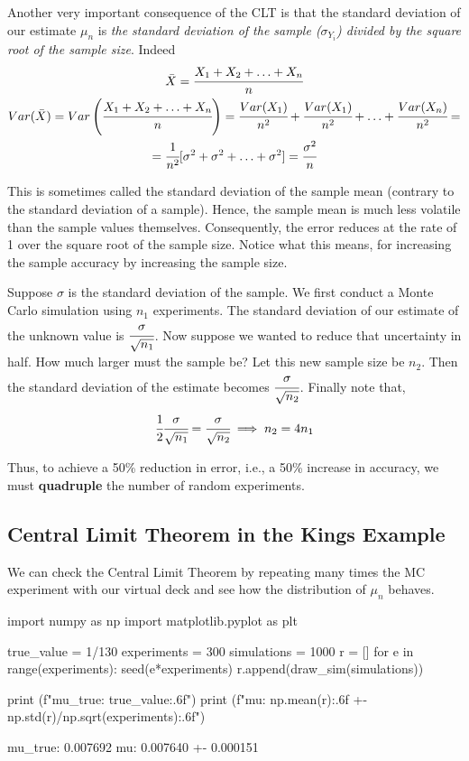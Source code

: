 Another very important consequence of the CLT is that the standard deviation of our estimate $\mu_n$ is \emph{the standard deviation of the sample ($\sigma_{Y_i}$) divided by the square root of the sample size}. Indeed
\begin{equation*}
\begin{gathered}
\bar{X} = \cfrac{X_1 + X_2 +\ldots +X_n}{n}\\
Var(\bar{X}) = Var\left(\cfrac{X_1 + X_2 +\ldots +X_n}{n}\right)=\cfrac{Var(X_1)}{n^2}+\cfrac{Var(X_1)}{n^2}+\ldots+\cfrac{Var(X_n)}{n^2} = \\
=\cfrac{1}{n^2}[\sigma^2+\sigma^2+\ldots+\sigma^2] = \cfrac{\sigma^2}{n}
\end{gathered}
\end{equation*}

This is sometimes called the standard deviation of the sample mean (contrary to the standard deviation of a sample). Hence, the sample mean is much less volatile than the sample values themselves. Consequently, the error reduces at the rate of 1 over the square root of the sample size. Notice what this means, for increasing the sample accuracy by increasing the sample size.

Suppose $\sigma$ is the standard deviation of the sample. We first conduct a Monte Carlo simulation using $n_1$ experiments. The standard deviation of our estimate of the unknown value is $\cfrac{\sigma}{\sqrt{n_1}}$. Now suppose we wanted to reduce that uncertainty in half. How much larger must the sample be? Let this new sample size be $n_2$. Then the standard deviation of the estimate becomes $\cfrac{\sigma}{\sqrt{n_2}}$.
Finally note that,
\begin{equation*}
  \cfrac{1}{2}\cfrac{\sigma}{\sqrt{n_1}}  = \cfrac{\sigma}{\sqrt{n_2}} \implies n_2 = 4 n_1
\end{equation*}

Thus, to achieve a 50\% reduction in error, i.e., a 50\% increase in accuracy, we must \textbf{quadruple} the number of random experiments.

\subsection{Central Limit Theorem in the Kings Example}

We can check the Central Limit Theorem by repeating many times the MC experiment with our virtual deck and see how the distribution of $\mu_n$ behaves.

\begin{ipython}
import numpy as np
import matplotlib.pyplot as plt

true_value = 1/130
experiments = 300
simulations = 1000
r = []
for e in range(experiments):
    seed(e*experiments)
    r.append(draw_sim(simulations))

print (f"mu_true: {true_value:.6f}")
print (f"mu: {np.mean(r):.6f} +- {np.std(r)/np.sqrt(experiments):.6f}")
\end{ipython}
\begin{ioutput}
mu_true: 0.007692
mu: 0.007640 +- 0.000151
\end{ioutput}

